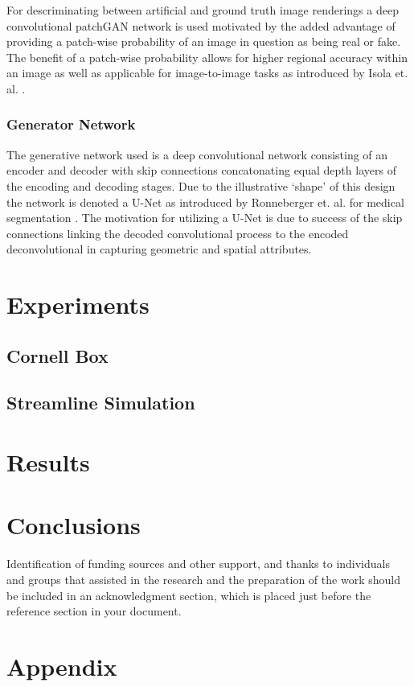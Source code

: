\documentclass[sigconf,authordraft]{acmart}
\begin{document}
For descriminating between artificial and ground truth image renderings a deep convolutional patchGAN network is used motivated by the added advantage of providing a patch-wise probability of an image in question as being real or fake. The benefit of a patch-wise probability allows for higher regional accuracy within an image as well as applicable for image-to-image tasks as introduced by Isola et. al. \cite{isolaPatch}.

\subsubsection{Generator Network}

The generative network used is a deep convolutional network consisting of an encoder and decoder with skip connections concatonating equal depth layers of the encoding and decoding stages. Due to the illustrative `shape' of this design the network is denoted a U-Net as introduced by Ronneberger et. al. for medical segmentation \cite{ronnebergerUnet}. The motivation for utilizing a U-Net is due to success of the skip connections linking the decoded convolutional process to the encoded deconvolutional in capturing geometric and spatial attributes.

\section{Experiments}

\subsection{Cornell Box}
\subsection{Streamline Simulation}

\section{Results}

\section{Conclusions}



\begin{acks}
Identification of funding sources and other support, and thanks to
individuals and groups that assisted in the research and the
preparation of the work should be included in an acknowledgment
section, which is placed just before the reference section in your
document.
\end{acks}




\appendix

\section{Appendix}
\end{document}
